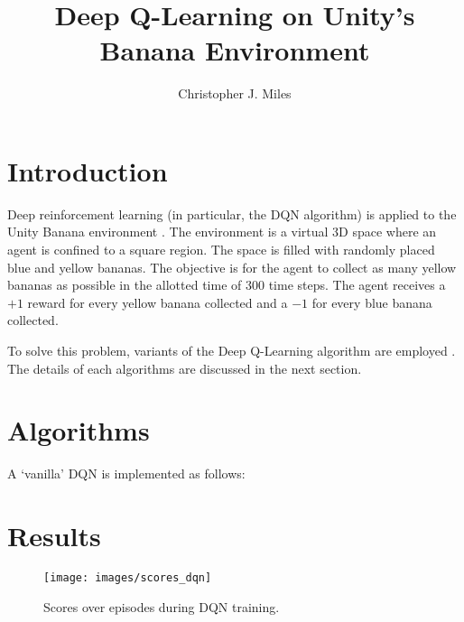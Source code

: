 \documentclass[12]{article}
\begin{document}
\title{Deep Q-Learning on Unity's Banana Environment}
\author{Christopher J. Miles}
\maketitle





\section{Introduction}

Deep reinforcement learning (in particular, the DQN algorithm) is applied to the Unity Banana environment \cite{unity}.  The environment is a virtual 3D space where an agent is confined to a square region. The space is filled with randomly placed blue and yellow bananas. The objective is for the agent to collect as many yellow bananas as possible in the allotted time of 300 time steps. The agent receives a $+1$ reward for every yellow banana collected and a $-1$ for every blue banana collected. 

To solve this problem, variants of the Deep Q-Learning algorithm are employed \cite{Wang2016,Schaul2016,Mnih2015}. The details of each algorithms are discussed in the next section.

\section{Algorithms}

A `vanilla' DQN \cite{Mnih2015} is implemented as follows:

\section{Results}

\begin{figure}
\texttt{[image: images/scores\_dqn]}
\caption{Scores over episodes during DQN training.}
\end{figure}


\end{document}
